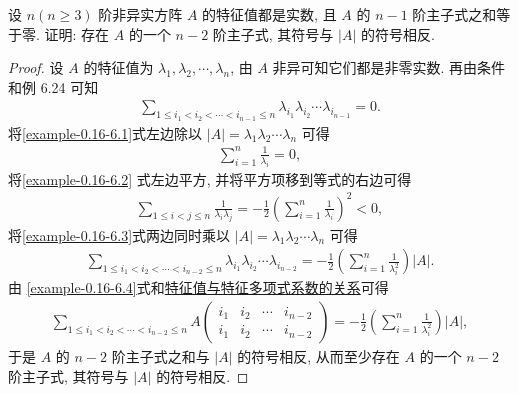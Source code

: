 \documentclass[../../main.tex]{subfiles}%
\begin{document}
\begin{example}
设 $n (n \geqslant  3)$ 阶非异实方阵 $A$ 的特征值都是实数, 且 $A$ 的 $n-1$ 阶主子式之和等于零. 证明: 存在 $A$ 的一个 $n-2$ 阶主子式, 其符号与 $|A|$ 的符号相反.
\end{example}
\begin{proof}
设 $A$ 的特征值为 $\lambda_1, \lambda_2, \cdots, \lambda_n$, 由 $A$ 非异可知它们都是非零实数. 再由条件和例 6.24 可知
\begin{align}
\sum_{1 \leqslant  i_1 < i_2 < \cdots < i_{n-1} \leqslant  n} \lambda_{i_1} \lambda_{i_2} \cdots \lambda_{i_{n-1}} = 0.\label{example-0.16-6.1}
\end{align}
将\eqref{example-0.16-6.1}式左边除以 $|A| = \lambda_1 \lambda_2 \cdots \lambda_n$ 可得
\begin{align}
\sum_{i=1}^n \frac{1}{\lambda_i} = 0, \label{example-0.16-6.2}
\end{align}
将\eqref{example-0.16-6.2} 式左边平方, 并将平方项移到等式的右边可得
\begin{align}
\sum_{1 \leqslant  i < j \leqslant  n} \frac{1}{\lambda_i \lambda_j} = -\frac{1}{2} \left( \sum_{i=1}^n \frac{1}{\lambda_i} \right)^2 < 0, \label{example-0.16-6.3}
\end{align}
将\eqref{example-0.16-6.3}式两边同时乘以 $|A| = \lambda_1 \lambda_2 \cdots \lambda_n$ 可得
\begin{align}
\sum_{1 \leqslant  i_1 < i_2 < \cdots < i_{n-2} \leqslant  n} \lambda_{i_1} \lambda_{i_2} \cdots \lambda_{i_{n-2}} = -\frac{1}{2} \left( \sum_{i=1}^n \frac{1}{\lambda_i^2} \right) |A|. \label{example-0.16-6.4}
\end{align}
由 \eqref{example-0.16-6.4}式和\hyperref[proposition:特征值与特征多项式系数的关系]{特征值与特征多项式系数的关系}可得
\begin{align*}
\sum_{1 \leqslant  i_1 < i_2 < \cdots < i_{n-2} \leqslant  n} A \begin{pmatrix}
i_1 & i_2 & \cdots & i_{n-2} \\
i_1 & i_2 & \cdots & i_{n-2}
\end{pmatrix} = -\frac{1}{2} \left( \sum_{i=1}^n \frac{1}{\lambda_i^2} \right) |A|,
\end{align*}
于是 $A$ 的 $n-2$ 阶主子式之和与 $|A|$ 的符号相反, 从而至少存在 $A$ 的一个 $n-2$ 阶主子式, 其符号与 $|A|$ 的符号相反. 
\end{proof}
\end{document}
